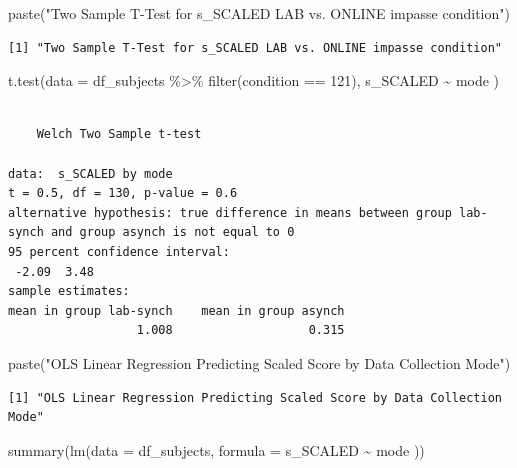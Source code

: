 \documentclass[
  letterpaper,
  DIV=11,
  numbers=noendperiod]{scrreprt}
\newenvironment{Shaded}{\begin{snugshade}}{\end{snugshade}}
\newcommand{\AttributeTok}[1]{\textcolor[rgb]{0.40,0.45,0.13}{#1}}
\newcommand{\DecValTok}[1]{\textcolor[rgb]{0.68,0.00,0.00}{#1}}
\newcommand{\FunctionTok}[1]{\textcolor[rgb]{0.28,0.35,0.67}{#1}}
\newcommand{\NormalTok}[1]{\textcolor[rgb]{0.00,0.23,0.31}{#1}}
\newcommand{\SpecialCharTok}[1]{\textcolor[rgb]{0.37,0.37,0.37}{#1}}
\newcommand{\StringTok}[1]{\textcolor[rgb]{0.13,0.47,0.30}{#1}}
\begin{document}
\begin{Shaded}
\begin{Highlighting}[]
\FunctionTok{paste}\NormalTok{(}\StringTok{"Two Sample T{-}Test for s\_SCALED LAB vs. ONLINE impasse condition"}\NormalTok{)}
\end{Highlighting}
\end{Shaded}

\begin{verbatim}
[1] "Two Sample T-Test for s_SCALED LAB vs. ONLINE impasse condition"
\end{verbatim}

\begin{Shaded}
\begin{Highlighting}[]
\FunctionTok{t.test}\NormalTok{(}\AttributeTok{data =}\NormalTok{ df\_subjects }\SpecialCharTok{\%\textgreater{}\%} \FunctionTok{filter}\NormalTok{(condition }\SpecialCharTok{==} \DecValTok{121}\NormalTok{), s\_SCALED }\SpecialCharTok{\textasciitilde{}}\NormalTok{ mode )}
\end{Highlighting}
\end{Shaded}

\begin{verbatim}

    Welch Two Sample t-test

data:  s_SCALED by mode
t = 0.5, df = 130, p-value = 0.6
alternative hypothesis: true difference in means between group lab-synch and group asynch is not equal to 0
95 percent confidence interval:
 -2.09  3.48
sample estimates:
mean in group lab-synch    mean in group asynch 
                  1.008                   0.315 
\end{verbatim}

\begin{Shaded}
\begin{Highlighting}[]
\FunctionTok{paste}\NormalTok{(}\StringTok{"OLS Linear Regression Predicting Scaled Score by Data Collection Mode"}\NormalTok{)}
\end{Highlighting}
\end{Shaded}

\begin{verbatim}
[1] "OLS Linear Regression Predicting Scaled Score by Data Collection Mode"
\end{verbatim}

\begin{Shaded}
\begin{Highlighting}[]
\FunctionTok{summary}\NormalTok{(}\FunctionTok{lm}\NormalTok{(}\AttributeTok{data =}\NormalTok{ df\_subjects, }\AttributeTok{formula =}\NormalTok{ s\_SCALED }\SpecialCharTok{\textasciitilde{}}\NormalTok{ mode ))}
\end{Highlighting}
\end{Shaded}
\end{document}
